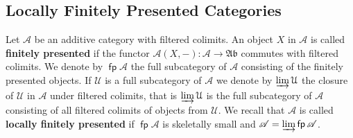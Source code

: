 \documentclass[oneside, a4paper,reqno]{amsart}
\numberwithin{equation}{section}
\theoremstyle{definition}
\begin{document}
\subsection{Locally Finitely Presented Categories} Let ${\mathscr A}$ be an
additive category with filtered colimits. An object $X$ in ${\mathscr A}$ is
called {\bf finitely presented} if the functor ${\mathscr A}(X,-) : {\mathscr A} {\longrightarrow}
{\mathfrak{Ab}}$ commutes with filtered colimits. We denote by $\operatorname*{\mathsf{fp}}{\mathscr A}$ the full
subcategory of ${\mathscr A}$ consisting of the finitely presented objects. If
${\mathcal U}$ is a full subcategory of ${\mathscr A}$ we denote by $\operatorname*{\varinjlim}{\mathcal U}$ the
closure of ${\mathcal U}$ in ${\mathscr A}$ under filtered colimits, that is $\operatorname*{\varinjlim}{\mathcal U}$
is the full subcategory of ${\mathscr A}$ consisting of all filtered colimits
of objects from ${\mathcal U}$.  We recall that ${\mathscr A}$ is called {\bf locally
finitely presented} if $\operatorname*{\mathsf{fp}}{\mathscr A}$ is skeletally small and ${\mathscr A} =
\operatorname*{\varinjlim}\operatorname*{\mathsf{fp}}{\mathscr A}$.
\end{document}

